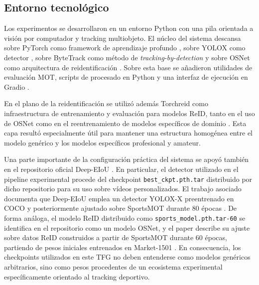 \documentclass[../MAIN.tex]{subfiles}
\begin{document}
	\subsection{Entorno tecnológico}
	
	Los experimentos se desarrollaron en un entorno Python con una pila orientada a visión por computador y tracking multiobjeto. El núcleo del sistema descansa sobre PyTorch como framework de aprendizaje profundo \parencite{pytorch_website}, sobre YOLOX como detector \parencite{yolox_paper,yolox_repo}, sobre ByteTrack como método de \textit{tracking-by-detection} \parencite{zhang2022bytetrack,bytetrack_repo} y sobre OSNet como arquitectura de reidentificación \parencite{osnet_paper}. Sobre esta base se añadieron utilidades de evaluación MOT, scripts de procesado en Python y una interfaz de ejecución en Gradio \parencite{gradio_repo}.
	
	En el plano de la reidentificación se utilizó además Torchreid como infraestructura de entrenamiento y evaluación para modelos ReID, tanto en el uso de OSNet como en el reentrenamiento de modelos específicos de dominio \parencite{torchreid_paper,torchreid_docs}. Esta capa resultó especialmente útil para mantener una estructura homogénea entre el modelo genérico y los modelos específicos profesional y amateur.
	
	Una parte importante de la configuración práctica del sistema se apoyó también en el repositorio oficial Deep-EIoU \parencite{deepeiou_repo,deepeiou_paper}. En particular, el detector utilizado en el pipeline experimental procede del checkpoint \texttt{best\_ckpt.pth.tar} distribuido por dicho repositorio para su uso sobre vídeos personalizados. El trabajo asociado documenta que Deep-EIoU emplea un detector YOLOX-X preentrenado en COCO y posteriormente ajustado sobre SportsMOT durante 80 épocas \parencite{deepeiou_paper}. De forma análoga, el modelo ReID distribuido como \texttt{sports\_model.pth.tar-60} se identifica en el repositorio como un modelo OSNet, y el paper describe su ajuste sobre datos ReID construidos a partir de SportsMOT durante 60 épocas, partiendo de pesos iniciales entrenados en Market-1501 \parencite{deepeiou_repo,deepeiou_paper}. En consecuencia, los checkpoints utilizados en este TFG no deben entenderse como modelos genéricos arbitrarios, sino como pesos procedentes de un ecosistema experimental específicamente orientado al tracking deportivo.
	
\end{document}
